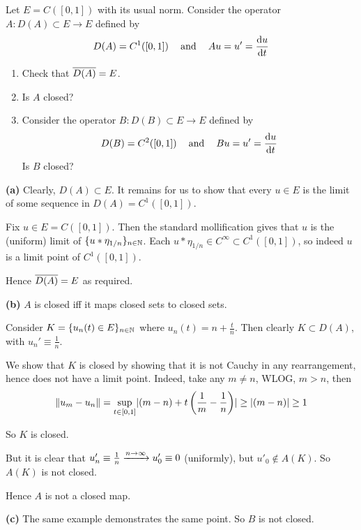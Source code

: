 \documentclass[a4paper, 10pt]{article}
\begin{document}
\begin{problem} 
    Let $E = C([0, 1])$ with its usual norm. Consider the operator $A: D(A) \subset E \to E$ defined by \begin{equation*}
    D(A) = C^1([0, 1]) \quad \:\text{and}\: \quad Au = u' = \frac{\mathrm{d} u}{\mathrm{d} t}
    \end{equation*}
    \begin{enumerate}
    \item Check that $\overline{D(A)} = E$.
    \item Is $A$ closed?
    \item Consider the operator $B: D(B) \subset E \to E$ defined by
    \begin{equation*}
        D(B) = C^2([0, 1]) \quad \:\text{and}\: \quad  Bu = u' = \frac{\mathrm{d} u}{\mathrm{d} t}
    \end{equation*}
    Is $B$ closed?
    \end{enumerate}
\end{problem}
\begin{solution}
    \textbf{(a)} Clearly, $D(A) \subset E$. It remains for us to show that every $u \in E$ is the limit of some sequence in $D(A) = C^1([0, 1])$.
    
    Fix $u \in E = C([0, 1])$. Then the standard mollification gives that $u$ is the (uniform) limit of $\{u * \eta_{1/n}\}_{n \in \mathbb{N}}$. Each $u * \eta_{1/n} \in C^\infty \subset C^1([0, 1])$, so indeed $u$ is a limit point of $C^1([0, 1])$. 

    Hence $\overline{D(A)} = E$ as required.

    \textbf{(b)} $A$ is closed iff it maps closed sets to closed sets.

    Consider $K = \{u_n(t) \in E\}_{n \in \mathbb{N}}$ where $u_n(t) = n + \frac{t}{n}$. Then clearly $K \subset D(A)$, with $u_n' \equiv \frac{1}{n}$.

    We show that $K$ is closed by showing that it is not Cauchy in any rearrangement, hence does not have a limit point. Indeed, take any $m \neq n$, WLOG, $m > n$, then \begin{equation*}
        \lVert u_m - u_n\rVert = \sup_{t \in [0, 1]} \lvert(m-n) + t\left(\frac{1}{m} - \frac{1}{n}\right)\rvert \geq \lvert(m-n)\rvert \geq 1
    \end{equation*}

    So $K$ is closed.

    But it is clear that $u'_n \equiv \frac{1}{n} \xrightarrow{n \to \infty} u'_0 \equiv 0$ (uniformly), but $u'_0 \not \in A(K)$. So $A(K)$ is not closed.

    Hence $A$ is not a closed map.

    \textbf{(c)} The same example demonstrates the same point. So $B$ is not closed.

\end{solution}
\end{document}
